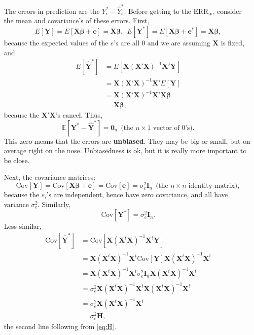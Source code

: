 \documentclass[
]{book}
\begin{document}
The errors in prediction are the \(Y_i^{*} - \widehat Y_i^{*}\). Before getting to the \(\text{ERR}_{\text{in}}\), consider the mean and covariance's of these errors. First,
\begin{equation}
E[\mathbf{Y}] = E[\mathbf{X}\boldsymbol{\beta}+\mathbf{e}] = \mathbf{X}\boldsymbol{\beta},~~E[\mathbf{Y}^{*}] = E[\mathbf{X}\boldsymbol{\beta}+\mathbf{e}^{*}] = \mathbf{X}\boldsymbol{\beta},
\label{eq:predls4}
\end{equation}
because the expected values of the \(e\)'s are all 0 and we are assuming \(\mathbf{X}\) is fixed, and
\begin{align}
E[\widehat {\mathbf{Y}}^{*}] &= E[\mathbf{X}(\mathbf{X}'\mathbf{X})^{-1}\mathbf{X}'\mathbf{Y}]\\
&= \mathbf{X}(\mathbf{X}'\mathbf{X})^{-1}\mathbf{X}'E[\mathbf{Y}]\\ 
&= \mathbf{X}(\mathbf{X}'\mathbf{X})^{-1}\mathbf{X}'\mathbf{X}\boldsymbol{\beta}\\ 
&= \mathbf{X}\boldsymbol{\beta},
\label{eq:predls4-1}
\end{align}
because the \(\mathbf{X}'\mathbf{X}\)'s cancel. Thus,
\begin{equation}
\mathbb{E}[\mathbf{Y}^{*} - \widehat {\mathbf{Y}}^{*}] = \mathbf{0}_n~~\mbox{(the $n\times 1$ vector of 0's)}.
\label{eq:predls5}
\end{equation}
This zero means that the errors are \textbf{unbiased}. They may be big or small, but on average right on the nose. Unbiasedness is ok, but it is really more important to be close.

Next, the covariance matrices:
\begin{equation}
\text{Cov}[\mathbf{Y}] = \text{Cov}[\mathbf{X}\boldsymbol{\beta}+\mathbf{e}] = \text{Cov}[\mathbf{e}] = \sigma_e^2\mathbf{I}_n~~\mbox{(the $n\times n$ identity matrix)},
\label{eq:predls6}
\end{equation}
because the \(e_i\)'s are independent, hence have zero covariance, and all have variance \(\sigma^2_e\).
Similarly,
\begin{equation}
\text{Cov}[\mathbf{Y}^{*}] = \sigma_e^2\mathbf{I}_n.
\label{eq:predls7}
\end{equation}
Less similar,
\begin{align}
\text{Cov}[\widehat {\mathbf{Y}}^{*}] &= \text{Cov}[\mathbf{X}(\mathbf{X}^t\mathbf{X})^{-1}\mathbf{X}^t\mathbf{Y}]\\
&=\mathbf{X}(\mathbf{X}^t\mathbf{X})^{-1}\mathbf{X}^t \text{Cov}[\mathbf{Y}] \mathbf{X}(\mathbf{X}^t\mathbf{X})^{-1}\mathbf{X}^t\\
&=\mathbf{X}(\mathbf{X}^t\mathbf{X})^{-1}\mathbf{X}^t \sigma^2_e\mathbf{I}_n \mathbf{X}(\mathbf{X}^t\mathbf{X})^{-1}\mathbf{X}^t\\
&=\sigma^2_e\mathbf{X}(\mathbf{X}^t\mathbf{X})^{-1}\mathbf{X}^t\mathbf{X}(\mathbf{X}^t\mathbf{X})^{-1}\mathbf{X}^t\\
&=\sigma^2_e\mathbf{X}(\mathbf{X}^t\mathbf{X})^{-1}\mathbf{X}^t\\
&=\sigma^2_e\mathbf{H},
\label{eq:predls8}
\end{align}
the second line following from \eqref{eq:H}.
\end{document}
